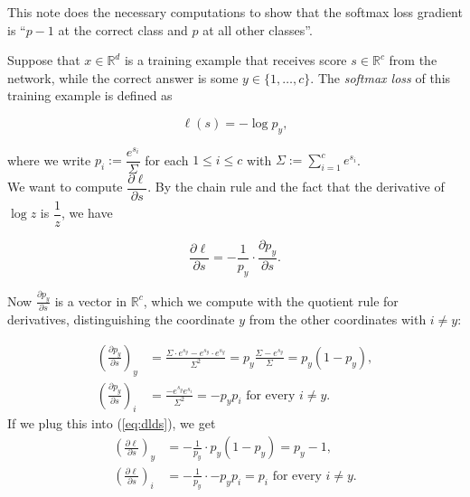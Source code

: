 \documentclass{article}
\begin{document}
This note does the necessary computations to show that the softmax loss gradient is ``$p - 1$ at the correct class and $p$ at all other classes''.

Suppose that $x \in \mathbb R^d$ is a training example that receives score $s \in \mathbb R^c$ from the network, while the correct answer is some $y \in \{1, \dots, c\}$. %
The \emph{softmax loss} of this training example is defined as

\[\ell(s) = -\log p_y,\]

where we write $p_i := \dfrac{e^{s_i}}{\Sigma}$ for each $1 \leq i \leq c$ with $\Sigma := \sum_{i=1}^c e^{s_i}$.\\

We want to compute $\dfrac{\partial \ell}{\partial s}$. By the chain rule and the fact that the derivative of $\log z$ is $\dfrac{1}{z}$, we have

\begin{equation}\label{eq:dlds}
  \frac{\partial \ell}{\partial s} = - \frac{1}{p_y} \cdot \frac{\partial p_y}{\partial s}.
  \end{equation}

Now $\frac{\partial p_y}{\partial s}$ is a vector in $\mathbb R^c$, which we compute with the quotient rule for derivatives, distinguishing the coordinate $y$ from the other coordinates with $i \neq y$:

\begin{align*} \left(\frac{\partial p_y}{\partial s}\right)_y &= \frac{\Sigma \cdot e^{s_y}  - e^{s_y} \cdot e^{s_y}}{\Sigma^2} = p_y \frac{\Sigma - e^{s_y}}{\Sigma} = p_y(1-p_y),\\
  \left(\frac{\partial p_y}{\partial s}\right)_i &= \frac{-e^{s_y} e^{s_i}}{\Sigma^2} = -p_y p_i \text{ for every } i \neq y.
\end{align*}                                                   
If we plug this into (\ref{eq:dlds}), we get
\begin{align*}
  \left(\frac{\partial \ell}{\partial s}\right)_y &= -\frac{1}{p_y} \cdot p_y (1 - p_y) = p_y - 1,\\
  \left(\frac{\partial \ell}{\partial s}\right)_i &= -\frac{1}{p_y} \cdot - p_y p_i = p_i \text{ for every } i \neq y.
\end{align*}                                                                              
\end{document}

